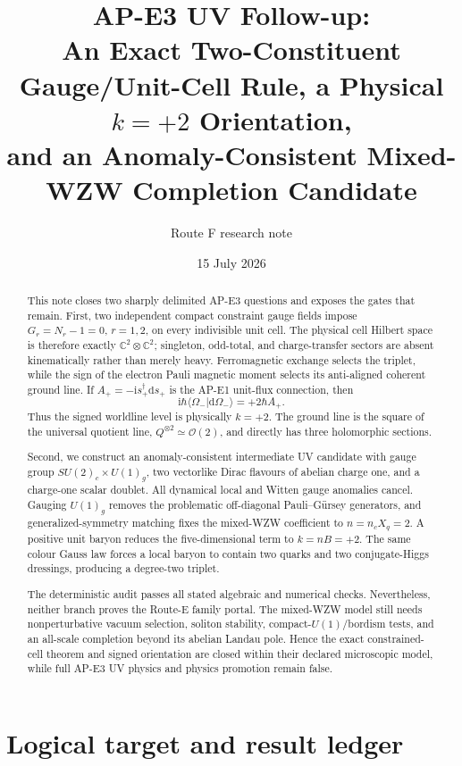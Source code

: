 \documentclass[11pt]{article}
\title{AP-E3 UV Follow-up:\\
An Exact Two-Constituent Gauge/Unit-Cell Rule, a Physical \(k=+2\) Orientation,\\
and an Anomaly-Consistent Mixed-WZW Completion Candidate}
\author{Route F research note}
\date{15 July 2026}
\theoremstyle{definition}
\theoremstyle{remark}
\newcommand{\ii}{\mathrm i}
\newcommand{\dd}{\mathrm d}
\newcommand{\CC}{\mathbb C}
\newcommand{\cO}{\mathcal O}
\newcommand{\braket}[2]{\langle #1\vert #2\rangle}
\begin{document}
\maketitle

\begin{abstract}
This note closes two sharply delimited AP-E3 questions and exposes the gates
that remain.  First, two independent compact constraint gauge fields impose
\(G_r=N_r-1=0\), \(r=1,2\), on every indivisible unit cell.  The physical
cell Hilbert space is therefore exactly \(\CC^2\otimes\CC^2\); singleton,
odd-total, and charge-transfer sectors are absent kinematically rather than
merely heavy.  Ferromagnetic exchange selects the triplet, while the sign of
the electron Pauli magnetic moment selects its anti-aligned coherent ground
line.  If \(A_+=-\ii s_+^\dagger\dd s_+\) is the AP-E1 unit-flux connection,
then
\[
 \ii\hbar\braket{\Omega_-}{\dd\Omega_-}=+2\hbar A_+.
\]
Thus the signed worldline level is physically \(k=+2\).  The ground line is
the square of the universal quotient line,
\(Q^{\otimes2}\simeq\cO(2)\), and directly has three holomorphic sections.

Second, we construct an anomaly-consistent intermediate UV candidate with
gauge group \(SU(2)_c\times U(1)_g\), two vectorlike Dirac flavours of
abelian charge one, and a charge-one scalar doublet.  All dynamical local and
Witten gauge anomalies cancel.  Gauging \(U(1)_g\) removes the problematic
off-diagonal Pauli--G\"ursey generators, and generalized-symmetry matching
fixes the mixed-WZW coefficient to
\(n=n_cX_q=2\).  A positive unit baryon reduces the five-dimensional term to
\(k=nB=+2\).  The same colour Gauss law forces a local baryon to contain two
quarks and two conjugate-Higgs dressings, producing a degree-two triplet.

The deterministic audit passes all stated algebraic and numerical checks.
Nevertheless, neither branch proves the Route-E family portal.  The mixed-WZW
model still needs nonperturbative vacuum selection, soliton stability,
compact-\(U(1)\)/bordism tests, and an all-scale completion beyond its
abelian Landau pole.  Hence the exact constrained-cell theorem and signed
orientation are closed within their declared microscopic model, while full
AP-E3 UV physics and physics promotion remain false.
\end{abstract}

\tableofcontents

\section{Logical target and result ledger}
\end{document}
